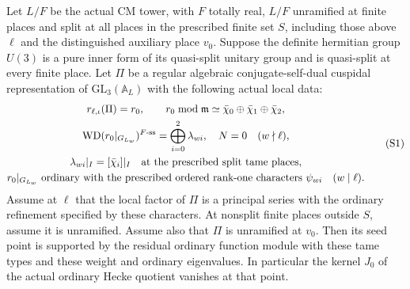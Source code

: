 \begin{srlemma}\label{lem:sr-stable-three-seed-insertion}
Let \(L/F\) be the actual CM tower, with \(F\) totally real,
\(L/F\) unramified at finite places and split at all places in
the prescribed finite set \(S\), including those above \(\ell\)
and the distinguished auxiliary place \(v_0\).
Suppose the definite hermitian group \(U(3)\) is a pure inner
form of its quasi-split unitary group and is quasi-split at
every finite place.
Let \(\Pi\) be a regular algebraic conjugate-self-dual
cuspidal representation of \(\mathrm{GL}_3(\mathbb A_L)\)
with the following actual local data:
\[
 \begin{gathered}
 r_{\ell,\iota}(\Pi)=r_0,\qquad
 r_0\bmod\mathfrak m\simeq
                  \bar\chi_0\oplus\bar\chi_1\oplus\bar\chi_2,\\
 \mathrm{WD}(r_0|_{G_{L_w}})^{F\text{-ss}}
       =\bigoplus_{i=0}^2 \lambda_{wi},\quad N=0
                    \quad(w\nmid\ell),\\
 \lambda_{wi}|_I=[\bar\chi_i]|_I
        \quad\hbox{at the prescribed split tame places},\\
 r_0|_{G_{L_w}}\ \hbox{ordinary with the prescribed ordered
 rank-one characters }\psi_{wi}
                    \quad(w\mid\ell).
 \end{gathered}
 \tag{S1}
\]
Assume at \(\ell\) that the local factor of \(\Pi\) is a
principal series with the ordinary refinement specified by
these characters. At nonsplit finite places outside \(S\),
assume it is unramified.
Assume also that \(\Pi\) is unramified at \(v_0\).
Then its seed point is supported by the residual ordinary
function module with these tame types and these weight
and ordinary eigenvalues.
In particular the kernel \(J_0\) of the actual ordinary
Hecke quotient vanishes at that point.
\end{srlemma}
